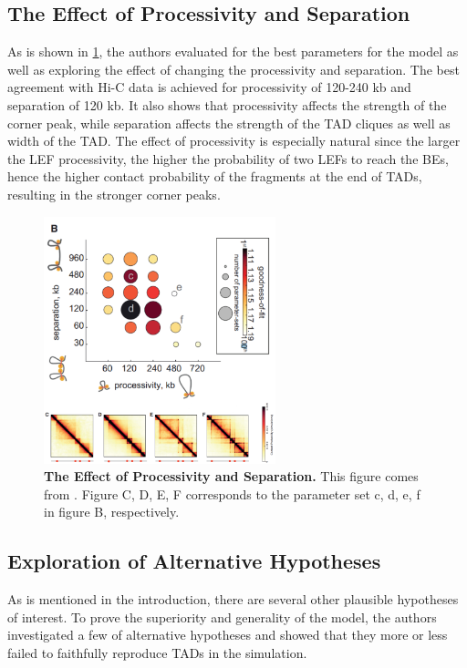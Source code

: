 \documentclass[11pt]{article}
\begin{document}
\subsection{The Effect of Processivity and Separation}

As is shown in \cref{fig:processivity and separation}, the authors evaluated for the best parameters for the model as well as exploring the effect of changing the processivity and separation. The best agreement with Hi-C data is achieved for processivity of 120-240 kb and separation of 120 kb. It also shows that processivity affects the strength of the corner peak, while separation affects the strength of the TAD cliques as well as width of the TAD. The effect of processivity is especially natural since the larger the LEF processivity, the higher the probability of two LEFs to reach the BEs, hence the higher contact probability of the fragments at the end of TADs, resulting in the stronger corner peaks.

\begin{figure}[htbp]
  \centering
  \includegraphics[width=0.6\textwidth]{assets/Snipaste_2023-01-13_18-19-27.png}
  \caption{\textbf{The Effect of Processivity and Separation.} This figure comes from \cite{fudenberg_formation_2016}. Figure C, D, E, F corresponds to the parameter set c, d, e, f in figure B, respectively.}
  \label{fig:processivity and separation}
\end{figure}

\subsection{Exploration of Alternative Hypotheses}

As is mentioned in the introduction, there are several other plausible hypotheses of interest. To prove the superiority and generality of the model, the authors investigated a few of alternative hypotheses and showed that they more or less failed to faithfully reproduce TADs in the simulation.
\end{document}
